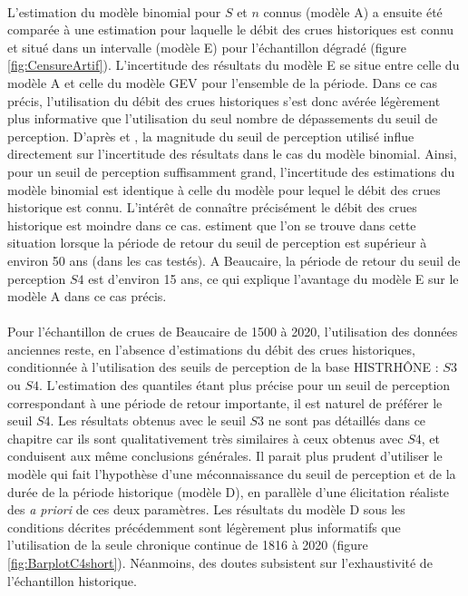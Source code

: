 	\paragraph{} L'estimation du modèle binomial pour $S$ et $n$ connus (modèle A) a ensuite été comparée à une estimation pour laquelle le débit des crues historiques est connu et situé dans un intervalle (modèle E) pour l'échantillon dégradé (figure \ref{fig:CensureArtif}). L'incertitude des résultats du modèle E se situe entre celle du modèle A et celle du modèle GEV pour l'ensemble de la période. Dans ce cas précis, l'utilisation du débit des crues historiques s'est donc avérée légèrement plus informative que l'utilisation du seul nombre de dépassements du seuil de perception. D'après \citet{stedinger_flood_1986} et \citet{payrastre_usefulness_2011}, la magnitude du seuil de perception utilisé influe directement sur l'incertitude des résultats dans le cas du modèle binomial. Ainsi, pour un seuil de perception suffisamment grand, l'incertitude des estimations du modèle binomial est identique à celle du modèle pour lequel le débit des crues historique est connu. L'intérêt de connaître précisément le débit des crues historique est moindre dans ce cas. \citet{payrastre_usefulness_2011} estiment que l'on se trouve dans cette situation lorsque la période de retour du seuil de perception est supérieur à environ 50 ans (dans les cas testés). A Beaucaire, la période de retour du seuil de perception $S4$ est d'environ 15 ans, ce qui explique l'avantage du modèle E sur le modèle A dans ce cas précis.
	
		\paragraph{} Pour l'échantillon de crues de Beaucaire de 1500 à 2020, l'utilisation des données anciennes reste, en l'absence d'estimations du débit des crues historiques, conditionnée à l'utilisation des seuils de perception de la base HISTRHÔNE : $S3$ ou $S4$. L'estimation des quantiles étant plus précise pour un seuil de perception correspondant à une période de retour importante, il est naturel de préférer le seuil $S4$. Les résultats obtenus avec le seuil $S3$ ne sont pas détaillés dans ce chapitre car ils sont qualitativement très similaires à ceux obtenus avec $S4$, et conduisent aux même conclusions générales. Il parait plus prudent d'utiliser le modèle qui fait l'hypothèse d'une méconnaissance du seuil de perception et de la durée de la période historique (modèle D), en parallèle d'une élicitation réaliste des \textit{a priori} de ces deux paramètres. Les résultats du modèle D sous les conditions décrites précédemment sont légèrement plus informatifs que l'utilisation de la seule chronique continue de 1816 à 2020 (figure \ref{fig:BarplotC4short}). Néanmoins, des doutes subsistent sur l'exhaustivité de l'échantillon historique. 
	
